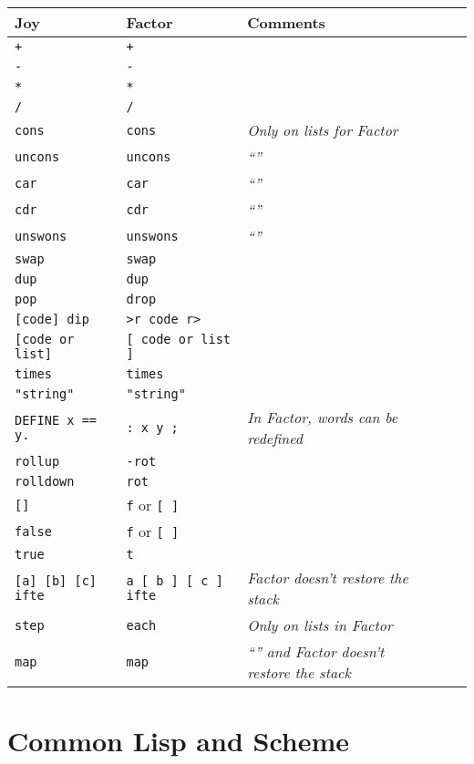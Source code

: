 \documentclass{article}
\begin{document}
\begin{tabular}{|l|lp{3.5cm}|lp{4cm}|} \hline
Joy & Factor & Comments\\ \hline
\texttt{+} & \texttt{+} &\\
\texttt{-} & \texttt{-} &\\
\texttt{*} & \texttt{*} &\\
\texttt{/} & \texttt{/} &\\
\texttt{cons} & \texttt{cons} & \emph{Only on lists for Factor}\\
\texttt{uncons} & \texttt{uncons} & \emph{``''}\\
\texttt{car} & \texttt{car} & \emph{``''}\\
\texttt{cdr} & \texttt{cdr} & \emph{``''}\\
\texttt{unswons} & \texttt{unswons} & \emph{``''}\\
\texttt{swap} & \texttt{swap} &\\
\texttt{dup} & \texttt{dup} &\\
\texttt{pop} & \texttt{drop} &\\
\texttt{[code] dip} & \texttt{>r code r>} &\\
\texttt{[code or list]} & \texttt{[ code or list ]} &\\
\texttt{times} & \texttt{times} &\\
\texttt{"string"} & \texttt{"string"} &\\
\texttt{DEFINE x == y.} & \texttt{: x y ;} & \emph{In Factor, words can be redefined}\\
\texttt{rollup} & \texttt{-rot} &\\
\texttt{rolldown} & \texttt{rot} &\\
\texttt{[]} & \texttt{f} or \texttt{[ ]} &\\
\texttt{false} & \texttt{f} or \texttt{[ ]} &\\
\texttt{true} & \texttt{t} &\\
\texttt{[a] [b] [c] ifte} & \texttt{a [ b ] [ c ] ifte} & \emph{Factor doesn't restore the stack}\\
\texttt{step} & \texttt{each} & \emph{Only on lists in Factor}\\
\texttt{map} & \texttt{map} & \emph{``'' and Factor doesn't restore the stack}\\
\hline
\end{tabular}

\section{Common Lisp and Scheme}
\end{document}
